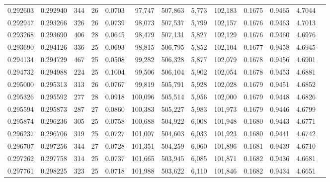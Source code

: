 \begin{tabular}{rrrrrrrrrrrrr}
0.292603 & 0.292940 & 344 &  26 &                                     0.0703 &  97,747 & 507,863 &   5,773 & 102,183 & 0.1675 & 0.9465 & 4.7044 \\
0.292947 & 0.293266 & 326 &  26 &                                     0.0739 &  98,073 & 507,537 &   5,799 & 102,157 & 0.1676 & 0.9463 & 4.7013 \\
0.293268 & 0.293690 & 406 &  28 &                                     0.0645 &  98,479 & 507,131 &   5,827 & 102,129 & 0.1676 & 0.9460 & 4.6976 \\
0.293690 & 0.294126 & 336 &  25 &                                     0.0693 &  98,815 & 506,795 &   5,852 & 102,104 & 0.1677 & 0.9458 & 4.6945 \\
0.294134 & 0.294729 & 467 &  25 &                                     0.0508 &  99,282 & 506,328 &   5,877 & 102,079 & 0.1678 & 0.9456 & 4.6901 \\
0.294732 & 0.294988 & 224 &  25 &                                     0.1004 &  99,506 & 506,104 &   5,902 & 102,054 & 0.1678 & 0.9453 & 4.6881 \\
0.295000 & 0.295313 & 313 &  26 &                                     0.0767 &  99,819 & 505,791 &   5,928 & 102,028 & 0.1679 & 0.9451 & 4.6852 \\
0.295326 & 0.295592 & 277 &  28 &                                     0.0918 & 100,096 & 505,514 &   5,956 & 102,000 & 0.1679 & 0.9448 & 4.6826 \\
0.295594 & 0.295873 & 287 &  27 &                                     0.0860 & 100,383 & 505,227 &   5,983 & 101,973 & 0.1679 & 0.9446 & 4.6799 \\
0.295874 & 0.296236 & 305 &  25 &                                     0.0758 & 100,688 & 504,922 &   6,008 & 101,948 & 0.1680 & 0.9443 & 4.6771 \\
0.296237 & 0.296706 & 319 &  25 &                                     0.0727 & 101,007 & 504,603 &   6,033 & 101,923 & 0.1680 & 0.9441 & 4.6742 \\
0.296707 & 0.297256 & 344 &  27 &                                     0.0728 & 101,351 & 504,259 &   6,060 & 101,896 & 0.1681 & 0.9439 & 4.6710 \\
0.297262 & 0.297758 & 314 &  25 &                                     0.0737 & 101,665 & 503,945 &   6,085 & 101,871 & 0.1682 & 0.9436 & 4.6681 \\
0.297761 & 0.298225 & 323 &  25 &                                     0.0718 & 101,988 & 503,622 &   6,110 & 101,846 & 0.1682 & 0.9434 & 4.6651 \\

\end{tabular}
